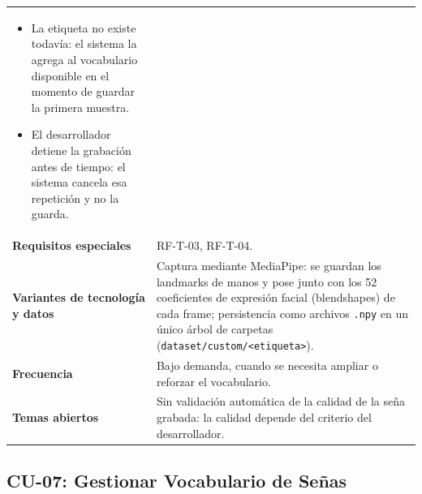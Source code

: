 \begin{longtable}{@{}>{\raggedright\arraybackslash}p{4.1cm} >{\raggedright\arraybackslash}p{\dimexpr\textwidth-4.1cm-2\tabcolsep\relax}@{}}
\begin{itemize}[leftmargin=*, itemsep=2pt]
    \item[2a.] La etiqueta no existe todavía: el sistema la agrega al
    vocabulario disponible en el momento de guardar la primera muestra.
    \item[6a.] El desarrollador detiene la grabación antes de tiempo: el
    sistema cancela esa repetición y no la guarda.
\end{itemize} \\
\textbf{Requisitos especiales} & RF-T-03, RF-T-04. \\
\textbf{Variantes de tecnología y datos} &
Captura mediante MediaPipe: se guardan los landmarks de manos y pose junto
con los 52 coeficientes de expresión facial (blendshapes) de cada frame;
persistencia como archivos \texttt{.npy} en un único árbol de carpetas
(\texttt{dataset/custom/\textless etiqueta\textgreater}). \\
\textbf{Frecuencia} &
Bajo demanda, cuando se necesita ampliar o reforzar el vocabulario. \\
\textbf{Temas abiertos} &
Sin validación automática de la calidad de la seña grabada: la calidad
depende del criterio del desarrollador. \\
\bottomrule
\end{longtable}

\subsection{CU-07: Gestionar Vocabulario de Señas}

